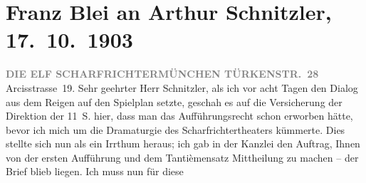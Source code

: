 

         
         \renewcommand{\erwaehntePersonen}{Personen: Fanny Johnson}
         \renewcommand{\erwaehnteInstitutionen}{Institutionen: Die elf Scharfrichter}
         \renewcommand{\erwaehnteOrte}{Orte: Arcisstraße, Edmund-Weiß-Gasse, England, Frankgasse, München, Türkenstraße (München), Wien}
         \renewcommand{\erwaehnteWerke}{Werke: Der grüne Kakadu. Groteske in einem Akt, Reigen. Zehn Dialoge}
               \section[Franz Blei an Arthur Schnitzler, 17. 10. 1903]{ Franz Blei an Arthur Schnitzler, 17. 10. 1903}\nopagebreak{}\rehead{ }\begin{ledgroupsized}[t]{13cm}\normalsize\beginnumbering \toendnotes[C]{\smallbreak\pagebreak[2]} 
\toendnotes[C]{\smallbreak}\pstart
           \noindent{}\centering{}{\pb}\textcolor{gray}{\textbf{DIE ELF SCHARFRICHTERMÜNCHEN TÜRKENSTR. 28}}\pend
           \pstart
           \noindent{}\raggedleft{}Arcisstrasse 19. \pend
           \pstart{}Sehr geehrter Herr Schnitzler,\pend\pstart
           als ich vor acht Tagen den Dialog aus dem Reigen
               auf den Spielplan setzte, geschah es auf die Versicherung der Direktion der 11 S. hier, dass man das Aufführungsrecht schon
               erworben hätte, bevor ich mich um die Dramaturgie des Scharfrichtertheaters kümmerte. Dies stellte sich nun als ein Irrthum
               heraus; ich gab in der Kanzlei den Auftrag, Ihnen von der ersten Aufführung und dem
               Tantièmensatz Mittheilung zu machen – der Brief blieb liegen. Ich muss nun für diese

\end{ledgroupsized}
